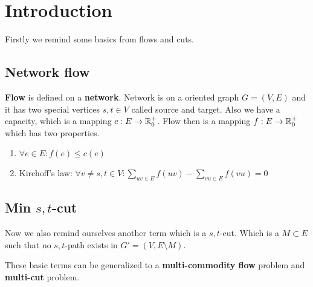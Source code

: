 \chapter{Introduction}

Firstly we remind some basics from flows and cuts. 

\section{Network flow}

\textbf{Flow} is defined on a \textbf{network}. Network is on a oriented graph $G = (V,E)$ and it has two special vertices $s,t \in V$ called source and target. Also we have a capacity, which is a mapping $c : E \to \mathbb{R}_{0}^{+}$. Flow then is a mapping $f : E \to \mathbb{R}_{0}^{+}$ which has two properties.

\begin{enumerate}
	\item $\forall e \in E: f(e) \leq c(e)$
	\item Kirchoff's law: $\forall v \neq s, t \in V: \sum_{uv \in E} f(uv) - \sum_{vu \in E} f(vu) = 0$
\end{enumerate}

\section{Min $s,t$-cut}

Now we also remind ourselves another term which is a $s,t$-cut. Which is a $M \subset E$ such that no $s,t$-path exists in $G' = (V, E \setminus M)$.

These basic terms can be generalized to a \textbf{multi-commodity flow} problem and \textbf{multi-cut} problem.